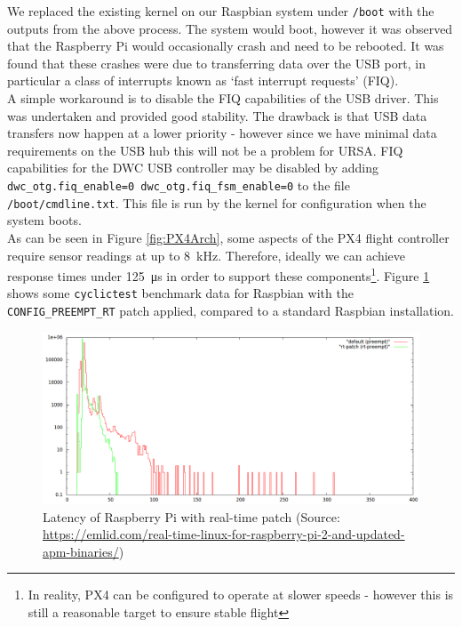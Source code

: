 \documentclass[capstone_report.tex]{subfiles}
\begin{document}
    We replaced the existing kernel on our Raspbian system under \texttt{/boot} with the outputs from the above process. The system would boot, however it was observed that the Raspberry Pi would occasionally crash and need to be rebooted. It was found that these crashes were due to transferring data over the USB port, in particular a class of interrupts known as `fast interrupt requests' (FIQ).\\

    A simple workaround is to disable the FIQ capabilities of the USB driver. This was undertaken and provided good stability. The drawback is that USB data transfers now happen at a lower priority - however since we have minimal data requirements on the USB hub this will not be a problem for URSA. FIQ capabilities for the DWC USB controller may be disabled by adding \texttt{dwc\_otg.fiq\_enable=0 dwc\_otg.fiq\_fsm\_enable=0} to the file \texttt{/boot/cmdline.txt}. This file is run by the kernel for configuration when the system boots.\\

    As can be seen in Figure \ref{fig:PX4Arch}, some aspects of the PX4 flight controller require sensor readings at up to \SI{8}{\kilo\hertz}. Therefore, ideally we can achieve response times under \SI{125}{\micro\second} in order to support these components\footnote{In reality, PX4 can be configured to operate at slower speeds - however this is still a reasonable target to ensure stable flight}. Figure \ref{fig:RT_bench} shows some \texttt{cyclictest} benchmark data for Raspbian with the \texttt{CONFIG\_PREEMPT\_RT} patch applied, compared to a standard Raspbian installation.

    \begin{figure}[H]
        \centering
        \includegraphics[width=\textwidth]{imgs/rpi2-cyclictest-plot.png}
        \caption{Latency of Raspberry Pi with real-time patch (Source: \url{https://emlid.com/real-time-linux-for-raspberry-pi-2-and-updated-apm-binaries/})\label{fig:RT_bench}}
    \end{figure}
\end{document}
